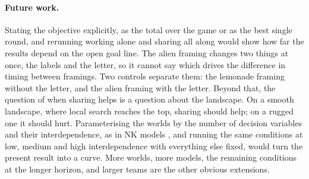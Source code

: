 \paragraph{Future work.}\label{sec:next}
Stating the objective explicitly, as the total over the game or as the best single round, and rerunning
working alone and sharing all along would show how far the results depend on the open goal line. The alien
framing changes two things at
once, the labels and the letter, so it cannot say which drives the difference in timing between framings. Two
controls separate them: the lemonade framing without the letter, and the alien framing with the letter. Beyond that, the question of when sharing helps is a question about
the landscape. On a smooth landscape, where local search reaches the top, sharing should help; on a rugged one
it should hurt. Parameterising the worlds by the number of decision variables and their interdependence, as in
NK models \citep{levinthal1997adaptation,lazer2007network}, and running the same conditions at low, medium and
high interdependence with everything else fixed, would turn the present result into a curve. More worlds, more
models, the remaining conditions at the longer horizon, and larger teams are the other obvious extensions.
